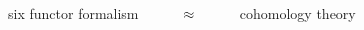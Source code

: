 \documentclass[UTF8]{amsart}
\numberwithin{equation}{section}
\theoremstyle{plain}
\numberwithin{equation}{section}
\theoremstyle{remark}
\begin{document}
six functor formalism $\hspace{10mm}\approx\hspace{10mm}$ cohomology theory








\end{document}
